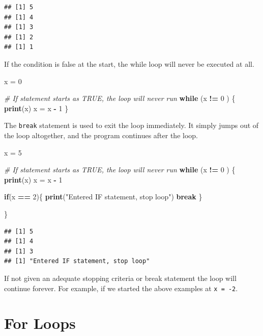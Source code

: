 \documentclass[
]{book}
\newenvironment{Shaded}{\begin{snugshade}}{\end{snugshade}}
\newcommand{\CommentTok}[1]{\textcolor[rgb]{0.56,0.35,0.01}{\textit{#1}}}
\newcommand{\ControlFlowTok}[1]{\textcolor[rgb]{0.13,0.29,0.53}{\textbf{#1}}}
\newcommand{\DecValTok}[1]{\textcolor[rgb]{0.00,0.00,0.81}{#1}}
\newcommand{\KeywordTok}[1]{\textcolor[rgb]{0.13,0.29,0.53}{\textbf{#1}}}
\newcommand{\NormalTok}[1]{#1}
\newcommand{\OperatorTok}[1]{\textcolor[rgb]{0.81,0.36,0.00}{\textbf{#1}}}
\newcommand{\StringTok}[1]{\textcolor[rgb]{0.31,0.60,0.02}{#1}}
\begin{document}
\begin{verbatim}
## [1] 5
## [1] 4
## [1] 3
## [1] 2
## [1] 1
\end{verbatim}

If the condition is false at the start, the while loop will never be executed at all.

\begin{Shaded}
\begin{Highlighting}[]
\NormalTok{x =}\StringTok{ }\DecValTok{0}

\CommentTok{# If statement starts as TRUE,  the loop will never run }
\ControlFlowTok{while}\NormalTok{ (x }\OperatorTok{!=}\StringTok{ }\DecValTok{0}\NormalTok{ ) \{}
  \KeywordTok{print}\NormalTok{(x)}
\NormalTok{  x =}\StringTok{ }\NormalTok{x }\OperatorTok{-}\StringTok{ }\DecValTok{1}
\NormalTok{\}}
\end{Highlighting}
\end{Shaded}

The \texttt{break} statement is used to exit the loop immediately. It simply jumps out of the loop altogether, and the program continues after the loop.

\begin{Shaded}
\begin{Highlighting}[]
\NormalTok{x =}\StringTok{ }\DecValTok{5}

\CommentTok{# If statement starts as TRUE,  the loop will never run }
\ControlFlowTok{while}\NormalTok{ (x }\OperatorTok{!=}\StringTok{ }\DecValTok{0}\NormalTok{ ) \{}
  \KeywordTok{print}\NormalTok{(x)}
\NormalTok{  x =}\StringTok{ }\NormalTok{x }\OperatorTok{-}\StringTok{ }\DecValTok{1}
  
  \ControlFlowTok{if}\NormalTok{(x }\OperatorTok{==}\StringTok{ }\DecValTok{2}\NormalTok{)\{}
    \KeywordTok{print}\NormalTok{(}\StringTok{"Entered IF statement, stop loop"}\NormalTok{)}
    \ControlFlowTok{break} 
\NormalTok{  \}}
  
\NormalTok{\}}
\end{Highlighting}
\end{Shaded}

\begin{verbatim}
## [1] 5
## [1] 4
## [1] 3
## [1] "Entered IF statement, stop loop"
\end{verbatim}

If not given an adequate stopping criteria or break statement the loop will continue forever. For example, if we started the above examples at \texttt{x\ =\ -2}.

\hypertarget{for-loops}{%
\section{For Loops}\label{for-loops}}
\end{document}
